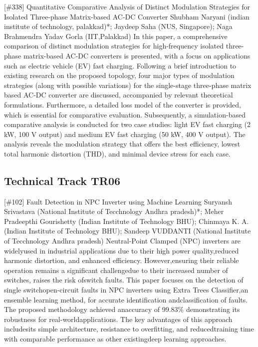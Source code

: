 {} \begin{abstract_online} {[\#338] Quantitative Comparative Analysis of Distinct Modulation Strategies for Isolated Three-phase Matrix-based AC-DC Converter} {} {Shubham Naryani (indian institute of technology, palakkad)*; Jaydeep  Saha (NUS, Singapore); Naga Brahmendra  Yadav Gorla (IIT,Palakkad)} {} In this paper, a comprehensive comparison of distinct modulation strategies for high-frequency isolated three-phase matrix-based AC-DC converters is presented, with a focus on applications such as electric vehicle (EV) fast charging. Following a brief introduction to existing research on the proposed topology, four major types of modulation strategies (along with possible variations) for the single-stage three-phase matrix based AC-DC converter are discussed, accompanied by relevant theoretical formulations. Furthermore, a detailed loss model of the converter is provided, which is essential for comparative evaluation. Subsequently, a simulation-based comparative analysis is conducted for two case studies: light EV fast charging (2 kW, 100 V output) and medium EV fast charging (50 kW, 400 V output). The analysis reveals the modulation strategy that offers the best efficiency, lowest total harmonic distortion (THD), and minimal device stress for each case. \end{abstract_online} 
\clearpage \subsection{Technical Track TR06}\nopagebreak {} \begin{abstract_online} {[\#102] Fault Detection in NPC Inverter using Machine Learning} {} {Suryansh Srivastava (National Institute of Tecchnology Andhra pradesh)*; Meher Pradeepthi Gourishetty (Indian Institute of Technology BHU); Chinmaya K. A. (Indian Institute of Technology BHU); Sandeep VUDDANTI (National Institute of Tecchnology Andhra pradesh)} {} Neutral-Point Clamped (NPC) inverters are widelyused in industrial applications due to their high power quality,reduced harmonic distortion, and enhanced efficiency. However,ensuring their reliable operation remains a significant challengedue to their increased number of switches, raises the risk ofswitch faults. This paper focuses on the detection of single switchopen-circuit faults in NPC inverters using Extra Trees Classifier,an ensemble learning method, for accurate identification andclassification of faults. The proposed methodology achieved anaccuracy of 99.83\% demonstrating its robustness for real-worldapplications. The key advantages of this approach includesits simple architecture, resistance to overfitting, and reducedtraining time with comparable performance as other existingdeep learning approaches. \end{abstract_online} 
